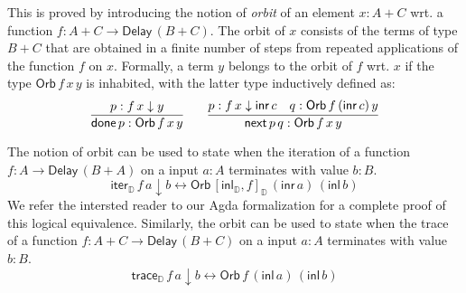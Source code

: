 \documentclass[runningheads,a4paper]{llncs}
\newcommand{\inl}{\mathsf{inl}}
\newcommand{\inr}{\mathsf{inr}}
\newcommand{\Delay}{\ensuremath{\mathsf{Delay}\,}}
\newcommand{\dn}{\downarrow}
\newcommand{\D}{\mathbb{D}}
\newcommand{\copairD}[2]{[#1,#2]_{\D}}
\newcommand{\inlD}{\mathsf{inl}_{\D}}
\newcommand{\iterD}{\mathsf{iter}_\D}
\newcommand{\traceD}{\mathsf{trace}_\D}
\newcommand{\Orb}[3]{\mathsf{Orb}\,#1\,#2\,#3}
\newcommand{\done}{\mathsf{done}}
\renewcommand{\next}{\mathsf{next}}
\begin{document}
This is proved by introducing the notion of \emph{orbit} of an element
$x : A + C$ wrt. a function $f : A + C \to \Delay (B + C)$. The orbit of
$x$ consists of the terms of type $B + C$ that are obtained in a
finite number of steps from repeated applications of the function $f$
on $x$. Formally, a term $y$ belongs to the orbit of $f$ wrt. $x$ if
the type $\Orb f x y $ is inhabited, with the latter type
inductively defined as: 
\[
\infer{\done\,p : \Orb f x y}{p : f \,x \dn y}
\qquad 
\infer{\next\,p \,q : \Orb f x y}{p : f \,x \dn \inr\,c & q : \Orb f
  {(\inr\,c)} y}
\]

The notion of orbit can be used to state when 
the iteration of a function $f : A \to \Delay (B + A)$ on a input
$a : A$ terminates with value $b : B$.
\[
\iterD\,f\,a \dn b \leftrightarrow \Orb {\copairD{\inlD}{f}} {(\inr\,a)} {(\inl\,b)}
\]
We refer the intersted reader to our Agda formalization for a complete
proof of this logical equivalence.
Similarly, the orbit can be used to state when 
the trace of a function $f : A + C \to \Delay (B + C)$ on a input
$a : A$ terminates with value $b : B$.
\begin{equation}\label{eq:traceorbit}
\traceD\,f\,a \dn b \leftrightarrow \Orb f{(\inl\,a)} {(\inl\,b)}
\end{equation}
\end{document}

